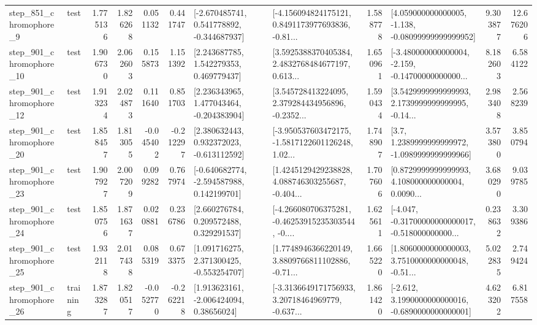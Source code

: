 \begin{tabular}{llrrrrllrlrr}
   step\_851\_chromophore\_9 &      test &      1.775136 &    1.826268 &      0.051132 &  0.441747 &   [-2.670485741, 0.541778892, -0.344687937] &  [-4.156094824175121, 0.8491173977693836, -0.81... &       1.588778 &  [4.059000000000005, -1.138, -0.08099999999999952] &            9.303877 &         12.676206 \\
  step\_901\_chromophore\_10 &      test &      1.906730 &    2.062603 &      0.155873 &  1.151392 &     [2.243687785, 1.542279353, 0.469779437] &  [3.5925388370405384, 2.4832768484677197, 0.613... &       1.650961 &  [-3.480000000000004, -2.159, -0.14700000000000... &            8.182603 &          6.584122 \\
  step\_901\_chromophore\_12 &      test &      1.913234 &    2.024873 &      0.111640 &  0.851703 &    [2.236343965, 1.477043464, -0.204383904] &  [3.545728413224095, 2.379284434956896, -0.2352... &       1.590434 &  [3.5429999999999993, 2.1739999999999995, -0.14... &            2.983408 &          2.568239 \\
  step\_901\_chromophore\_20 &      test &      1.858457 &    1.813055 &     -0.045402 & -0.212297 &    [2.380632443, 0.932372023, -0.613112592] &  [-3.950537603472175, -1.5817122601126248, 1.02... &       1.748907 &     [3.7, 1.2389999999999972, -1.0989999999999966] &            3.573800 &          3.850794 \\
  step\_901\_chromophore\_23 &      test &      1.907927 &    2.007209 &      0.099282 &  0.767974 &   [-0.640682774, -2.594587988, 0.142199701] &  [1.4245129429238828, 4.088746303255687, -0.404... &       1.707606 &  [0.8729999999999993, 4.108000000000004, 0.0090... &            3.680290 &          9.039785 \\
  step\_901\_chromophore\_24 &      test &      1.850756 &    1.871637 &      0.020881 &  0.236786 &     [2.660276784, 0.209572488, 0.329291537] &  [-4.266080706375281, -0.46253915235303544, -0.... &       1.625611 &  [-4.047, -0.31700000000000017, -0.518000000000... &            0.238632 &          3.309386 \\
  step\_901\_chromophore\_25 &      test &      1.932118 &    2.017438 &      0.085319 &  0.673375 &    [1.091716275, 2.371300425, -0.553254707] &  [1.7748946366220149, 3.8809766811102886, -0.71... &       1.665220 &  [1.8060000000000003, 3.7510000000000048, -0.51... &            5.022835 &          2.749424 \\
  step\_901\_chromophore\_26 &  training &      1.873287 &    1.820517 &     -0.052770 & -0.262218 &     [1.913623161, -2.006424094, 0.38656024] &  [-3.3136649171756933, 3.20718464969779, -0.637... &       1.861420 &  [-2.612, 3.1990000000000016, -0.6890000000000001] &            4.623202 &          6.817558 \\

\end{tabular}
